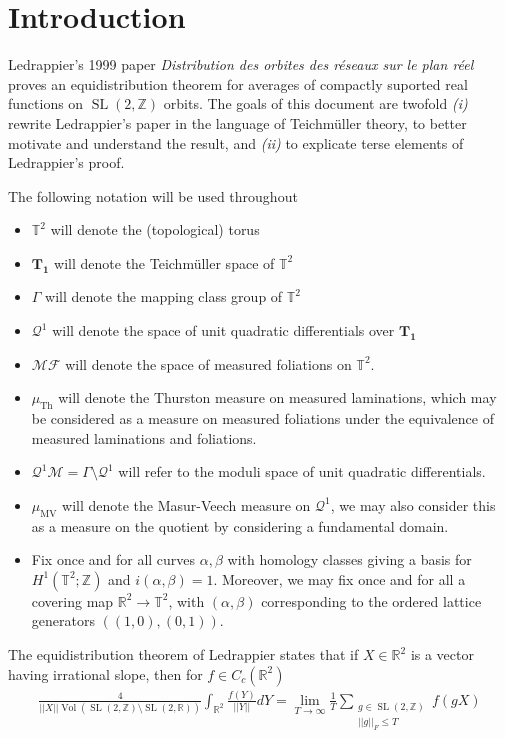 \documentclass{article}
\newcommand{\norm}[1]{\lvert\lvert#1\rvert\rvert}
\newcommand{\slr}{\operatorname{SL}(2,\mathbb{R})}
\newcommand{\slz}{\operatorname{SL}(2,\mathbb{Z})}
\newcommand{\uqd}{\mathcal{Q}^1}
\begin{document}
    \section{Introduction}
    Ledrappier's 1999 paper \emph{Distribution des orbites des réseaux sur le plan réel} \cite{Ledrappier_1999} proves an equidistribution theorem for averages of compactly suported real functions on \(\slz\) orbits. The goals of this document are twofold \emph{(i)} rewrite Ledrappier's paper in the language of Teichm\"uller theory, to better motivate and understand the result, and \emph{(ii)} to explicate terse elements of Ledrappier's proof.

    The following notation will be used throughout
    \begin{itemize}
        \item \(\mathbb{T}^2\) will denote the (topological) torus
        \item \(\mathbf{T_1}\) will denote the Teichm\"uller space of \(\mathbb{T}^2\) 
        \item \(\Gamma\) will denote the mapping class group of \(\mathbb{T}^2\)
        \item \(\uqd\) will denote the space of unit quadratic differentials over \(\mathbf{T_1}\)
        \item \(\mathscr{MF}\) will denote the space of measured foliations on \(\mathbb{T}^2\).
        \item \(\mu_{\operatorname{Th}}\) will denote the Thurston measure on measured laminations, which may be considered as a measure on measured foliations under the equivalence of measured laminations and foliations.
        \item \(\mathcal{Q}^1\mathcal{M} = \Gamma \setminus \mathcal{Q}^1\) will refer to the moduli space of unit quadratic differentials.
        \item \(\mu_{\operatorname{MV}}\) will denote the Masur-Veech measure on \(\mathcal{Q}^1\), we may also consider this as a measure on the quotient by considering a fundamental domain.
        \item Fix once and for all curves \(\alpha, \beta\) with homology classes giving a basis for \(H^1(\mathbb{T}^2;\mathbb{Z})\) and \(i(\alpha,\beta) = 1\). Moreover, we may fix once and for all a covering map \(\mathbb{R}^2 \to \mathbb{T}^2\), with \((\alpha,\beta)\) corresponding to the ordered lattice generators \(((1,0),(0,1))\).
    \end{itemize}

    The equidistribution theorem of Ledrappier states that if \(X \in \mathbb{R}^2\) is a vector having irrational slope, then for \(f \in C_c(\mathbb{R}^2)\)
    \begin{align*}
        \frac{4}{\norm{X}\operatorname{Vol}(\slz\setminus\slr)}\int_{\mathbb{R}^2} \frac{f(Y)}{\norm{Y}}dY = \lim_{T \to \infty} \frac{1}{T}\sum_{\substack{g \in \slz \\ \norm{g}_F \leq T}}f(gX)
    \end{align*}
\end{document}
